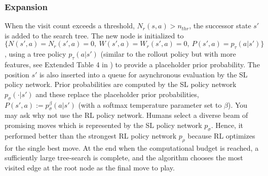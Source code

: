 
\subsubsection*{Expansion}When the visit count exceeds a threshold, $N_r(s, a) > n_{thr}$, the successor state $s'$ is added to the search tree. The new node is initialized to $\{ N(s',a) = N_r(s', a) = 0,\ W(s',a) = W_r(s',a) = 0,\ P(s',a) = p_\tau(a|s')\}$, using a tree policy $p_\tau(a|s')$ (similar to the rollout policy but with more features, see Extended Table 4 in \cite{b12}) to provide a placeholder prior probability. The position $s'$ is also inserted into a queue for asynchronous evaluation by the SL policy network. Prior probabilities are computed by the SL policy network $p_\sigma(\cdot |s')$ and these replace the placeholder prior probabilities, $P(s',a) := p_\sigma^\beta(a |s')$ (with a softmax temperature parameter set to $\beta$). You may ask why not use the RL policy network. Humans select a diverse beam of promising moves which is represented by the SL policy network $p_\sigma$. Hence, it performed better than the strongest RL policy network $p_\rho$ because RL optimizes for the single best move. At the end when the computational budget is reached, a sufficiently large tree-search is complete, and the algorithm chooses the most visited edge at the root node as the final move to play.


